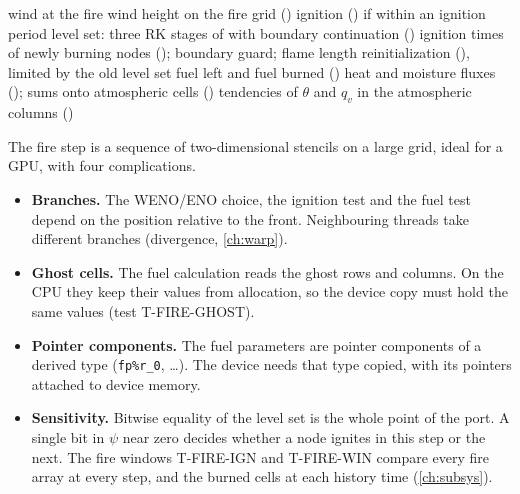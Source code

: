 \begin{algorithm}[ht]
\caption{One fire step on d02 (inside RK stage 1,  $\to$ ).}
\label{alg:fire-step}
\begin{algorithmic}[1]
\State wind at the fire wind height on the fire grid ()
\State ignition () if within an ignition period
\State level set: three RK stages of  with boundary continuation ()
\State ignition times of newly burning nodes (); boundary guard; flame length
\State reinitialization (), limited by the old level set
\State fuel left and fuel burned ()
\State heat and moisture fluxes (); sums onto atmospheric cells ()
\State tendencies of $\theta$ and $q_v$ in the atmospheric columns ()
\end{algorithmic}
\end{algorithm}

\begin{portnote}
The fire step is a sequence of two-dimensional stencils on a large grid, ideal for a GPU, with four complications.
\begin{itemize}
  \item \textbf{Branches.} The WENO/ENO choice, the ignition test and the fuel test depend on the position relative
    to the front. Neighbouring threads take different branches (divergence, \cref{ch:warp}).
  \item \textbf{Ghost cells.} The fuel calculation reads the ghost rows and columns. On the CPU they keep their values
    from allocation, so the device copy must hold the same values (test T-FIRE-GHOST).
  \item \textbf{Pointer components.} The fuel parameters are pointer components of a derived type (\texttt{fp\%r\_0},
    \dots). The device needs that type copied, with its pointers attached to device memory.
  \item \textbf{Sensitivity.} Bitwise equality of the level set is the whole point of the port. A single bit in
    $\psi$ near zero decides whether a node ignites in this step or the next. The fire windows T-FIRE-IGN and
    T-FIRE-WIN compare every fire array at every step, and the burned cells at each history time
    (\cref{ch:subsys}).
\end{itemize}
\end{portnote}
